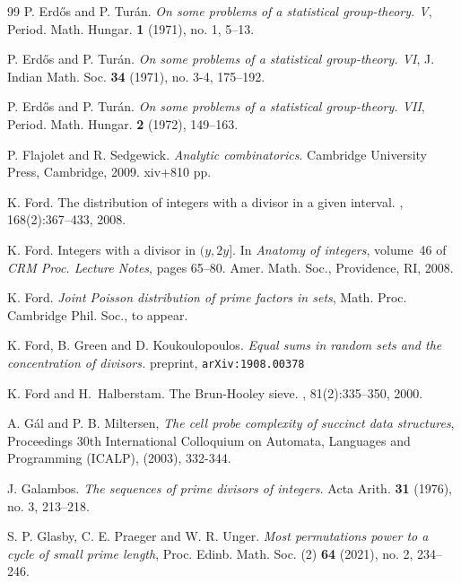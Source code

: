 \documentclass[10pt]{article}
\renewcommand{\(}{\left(}
\renewcommand{\)}{\right)}
\begin{document}
\begin{thebibliography}{99}
 {\sc P. Erd{\H o}s and P. Tur{\' a}n}.
 \emph{On some problems of a statistical group-theory. V},
 Period. Math. Hungar.  {\bf 1}  (1971),  no. 1, 5--13.

 {\sc P. Erd{\H o}s and P. Tur{\' a}n}.
 \emph{On some problems of a statistical group-theory. VI},
 J. Indian Math. Soc.  {\bf 34}  (1971),  no. 3-4, 175--192.
		
 {\sc P. Erd{\H o}s and P. Tur{\' a}n}.
 \emph{On some problems of a statistical group-theory. VII},
 Period. Math. Hungar.  {\bf 2}  (1972), 149--163.
		
%
%
%
%
%

{\sc P. Flajolet and R. Sedgewick}.
\emph{Analytic combinatorics}. Cambridge University Press, Cambridge, 2009. xiv+810 pp. 


 {\sc K. Ford}.
\newblock The distribution of integers with a divisor in a given interval.
, 168(2):367--433, 2008.

 {\sc K. Ford}.
\newblock Integers with a divisor in {$(y,2y]$}.
\newblock In {\em Anatomy of integers}, volume~46 of {\em CRM Proc. Lecture
  Notes}, pages 65--80. Amer. Math. Soc., Providence, RI, 2008.


 {\sc K. Ford}.
{\it Joint Poisson distribution of prime factors in sets},
Math. Proc. Cambridge Phil. Soc., to appear.


{\sc K. Ford, B. Green and D. Koukoulopoulos}.
 \emph{Equal sums in random sets and the concentration of divisors.}  preprint, \texttt{arXiv:1908.00378}

{\sc K. Ford and H.~Halberstam}.
\newblock The {B}run-{H}ooley sieve.
, 81(2):335--350, 2000.


{\sc A. G{\' a}l and P. B.  Miltersen},
\emph{The cell probe complexity of succinct data structures}, Proceedings 30th International Colloquium on Automata, Languages and Programming (ICALP), (2003),  332-344.

{\sc J. Galambos}.
\emph{The sequences of prime divisors of integers.}
Acta Arith. {\bf 31} (1976), no. 3, 213--218. 

{\sc S. P. Glasby, C. E. Praeger and W.  R. Unger}.
\emph{Most permutations power to a cycle of small prime length},
 Proc. Edinb. Math. Soc. (2) {\bf 64} (2021), no. 2, 234--246. 



\end{thebibliography}
\end{document}
